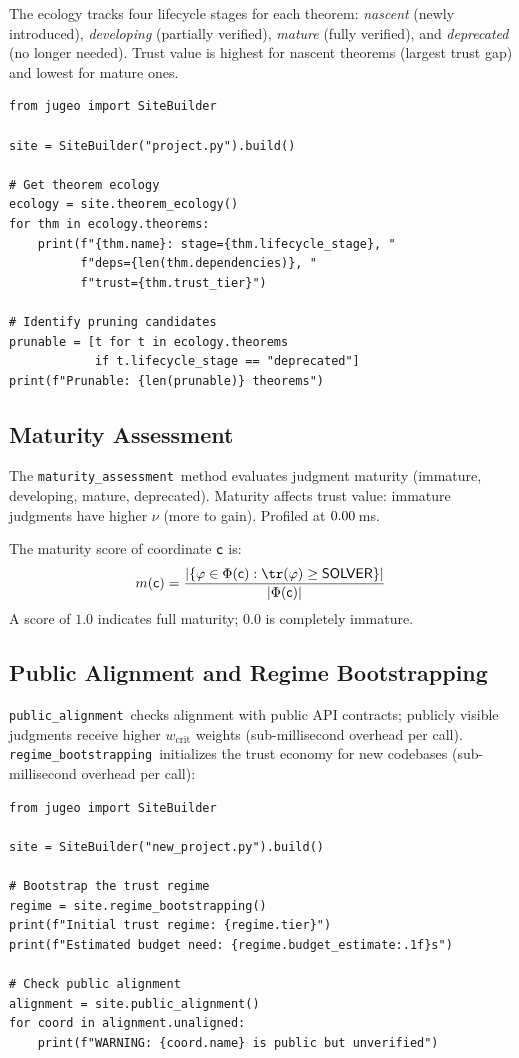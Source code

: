 \documentclass[11pt]{article}
\newcommand{\TrustValue}{\nu}
\newcommand{\MatAssess}{\texttt{maturity\_assessment}}
\newcommand{\PublicAlign}{\texttt{public\_alignment}}
\newcommand{\RegimeBoot}{\texttt{regime\_bootstrapping}}
\begin{document}
The ecology tracks four lifecycle stages for each theorem: \emph{nascent}
(newly introduced), \emph{developing} (partially verified),
\emph{mature} (fully verified), and \emph{deprecated} (no longer
needed).  Trust value is highest for nascent theorems (largest trust
gap) and lowest for mature ones.

\begin{lstlisting}[style=jugeo-python]
from jugeo import SiteBuilder

site = SiteBuilder("project.py").build()

# Get theorem ecology
ecology = site.theorem_ecology()
for thm in ecology.theorems:
    print(f"{thm.name}: stage={thm.lifecycle_stage}, "
          f"deps={len(thm.dependencies)}, "
          f"trust={thm.trust_tier}")

# Identify pruning candidates
prunable = [t for t in ecology.theorems
            if t.lifecycle_stage == "deprecated"]
print(f"Prunable: {len(prunable)} theorems")
\end{lstlisting}

\subsection{Maturity Assessment}
The \MatAssess\ method evaluates judgment maturity (immature,
developing, mature, deprecated).  Maturity affects trust value:
immature judgments have higher $\TrustValue$ (more to gain).
Profiled at $0.00$\,ms.

\begin{definition}\label{def:maturity}
The maturity score of coordinate $\mathsf{c}$ is:
\[
  m(\coord) = \frac{|\{\prop \in \Phi(\coord) :
  \tr(\prop) \geq \Tsolver\}|}{|\Phi(\coord)|}
\]
A score of $1.0$ indicates full maturity; $0.0$ is completely immature.
\end{definition}

\subsection{Public Alignment and Regime Bootstrapping}
\PublicAlign\ checks alignment with public API contracts; publicly
visible judgments receive higher $w_{\text{crit}}$ weights
(sub-millisecond overhead per call).  \RegimeBoot\ initializes the
trust economy for new codebases (sub-millisecond overhead per call):

\begin{lstlisting}[style=jugeo-python]
from jugeo import SiteBuilder

site = SiteBuilder("new_project.py").build()

# Bootstrap the trust regime
regime = site.regime_bootstrapping()
print(f"Initial trust regime: {regime.tier}")
print(f"Estimated budget need: {regime.budget_estimate:.1f}s")

# Check public alignment
alignment = site.public_alignment()
for coord in alignment.unaligned:
    print(f"WARNING: {coord.name} is public but unverified")
\end{lstlisting}
\end{document}
